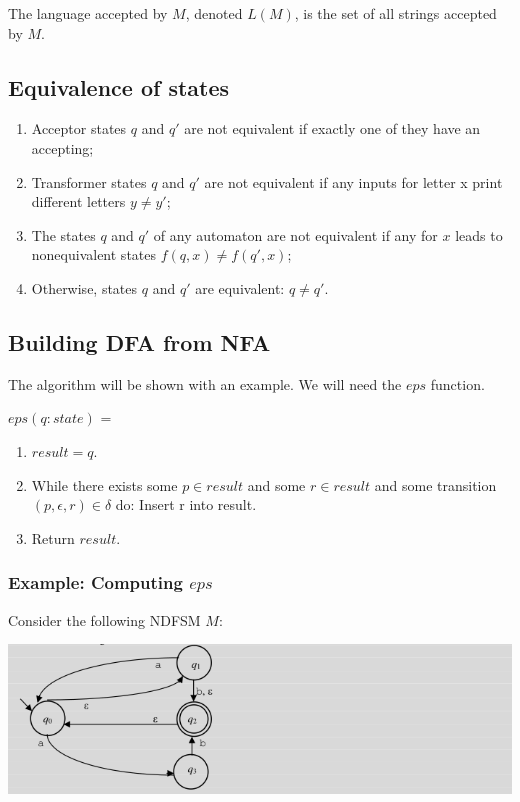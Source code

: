 \documentclass{article}
\begin{document}
The language accepted by $M$, denoted $L(M)$, is the set of all strings accepted by
$M$.

\subsection{Equivalence of states}

\begin{enumerate}
		\item Acceptor states $q$ and $q'$ are not equivalent if exactly one of
		they have an accepting;

		\item Transformer states $q$ and $q'$ are not equivalent if any inputs
		for letter x print different letters $y \ne y'$;

		\item The states $q$ and $q'$ of any automaton are not equivalent if any
		for $x$ leads to nonequivalent states $f(q,x) \ne f(q',x)$;

		\item Otherwise, states $q$ and $q'$ are equivalent: $q \ne q'$.
\end{enumerate}

\subsection{Building DFA from NFA}

The algorithm will be shown with an example. We will need the $eps$ function.

$eps(q: state)$ =
\begin{enumerate}
		\item $result = {q}$.
		\item While there exists some $p \in result$ and some $r \in result$ and some transition $(p, \epsilon, r) \in \delta$ do:
		Insert r into result.
		\item Return $result$.
\end{enumerate}

\subsubsection{Example: Computing $eps$}

Consider the following NDFSM $M$:

\includegraphics[width=\linewidth]{./img/eps.png}
\end{document}
